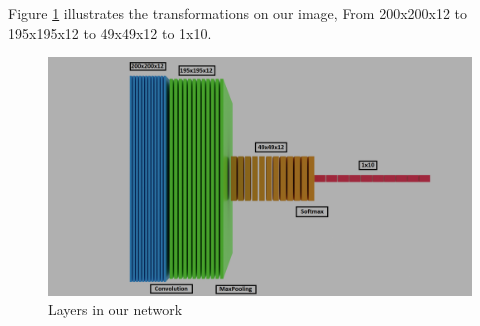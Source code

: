 \documentclass[conference]{IEEEtran}
\begin{document}

\break

Figure \ref{fig: layers} illustrates the transformations on our image,
From 200x200x12 to 195x195x12 to 49x49x12 to 1x10.

\begin{figure}[h]
  \centering
  \includegraphics[scale=0.2]{images/layers_image.png}
  \caption{Layers in our network\cite{Blender_Aug2021}}
  \label{fig: layers}
\end{figure}
\end{document}
